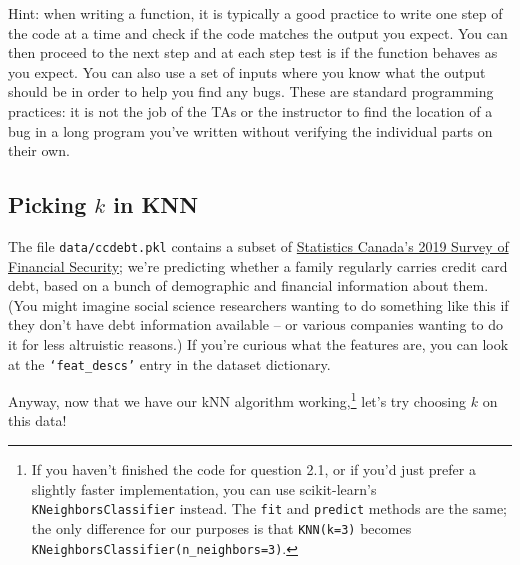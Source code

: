 \documentclass{article}
\begin{document}
Hint: when writing a function, it is typically a good practice to write one step of the code at a time and check if the code matches the output you expect. You can then proceed to the next step and at each step test is if the function behaves as you expect. You can also use a set of inputs where you know what the output should be in order to help you find any bugs. These are standard programming practices: it is not the job of the TAs or the instructor to find the location of a bug in a long program you've written without verifying the individual parts on their own.

\pagebreak

\subsection{Picking $k$ in KNN}
The file \texttt{data/ccdebt.pkl} contains a subset of \href{https://www23.statcan.gc.ca/imdb/p2SV.pl?Function=getSurvey&SDDS=2620}{Statistics Canada's 2019 Survey of Financial Security}; we're predicting whether a family regularly carries credit card debt, based on a bunch of demographic and financial information about them. (You might imagine social science researchers wanting to do something like this if they don't have debt information available -- or various companies wanting to do it for less altruistic reasons.) If you're curious what the features are, you can look at the \texttt{`feat\_descs'} entry in the dataset dictionary.

Anyway, now that we have our kNN algorithm working,\footnote{If you haven't finished the code for question 2.1, or if you'd just prefer a slightly faster implementation, you can use scikit-learn's \texttt{KNeighborsClassifier} instead. The \texttt{fit} and \texttt{predict} methods are the same; the only difference for our purposes is that \texttt{KNN(k=3)} becomes \texttt{KNeighborsClassifier(n\_neighbors=3)}.} let's try choosing $k$ on this data!
\end{document}

